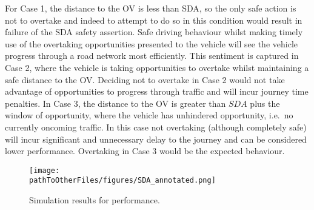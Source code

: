 For Case 1, the distance to the OV is less than SDA, so the only safe action is not to overtake and indeed to attempt to do so in this condition would result in failure of the SDA safety assertion. Safe driving behaviour whilst making timely use of the overtaking opportunities presented to the vehicle will see the vehicle progress through a road network most efficiently. This sentiment is captured in Case 2, where the vehicle is taking opportunities to overtake whilst maintaining a safe distance to the OV. Deciding not to overtake in Case 2 would not take advantage of opportunities to progress through traffic and will incur journey time penalties. In Case 3, the distance to the OV is greater than $SDA$ plus the window of opportunity, where the vehicle has unhindered opportunity, i.e.\ no currently oncoming traffic. In this case not overtaking (although completely safe) will incur significant and unnecessary delay to the journey and can be considered lower performance. Overtaking in Case 3 would be the expected behaviour. %
%

\begin{figure}[t]
    \centering
    \texttt{[image: \\pathToOtherFiles/figures/SDA\_annotated.png]}
    \caption{Simulation results for performance.}
    \label{fig:performance_results}
\end{figure}

